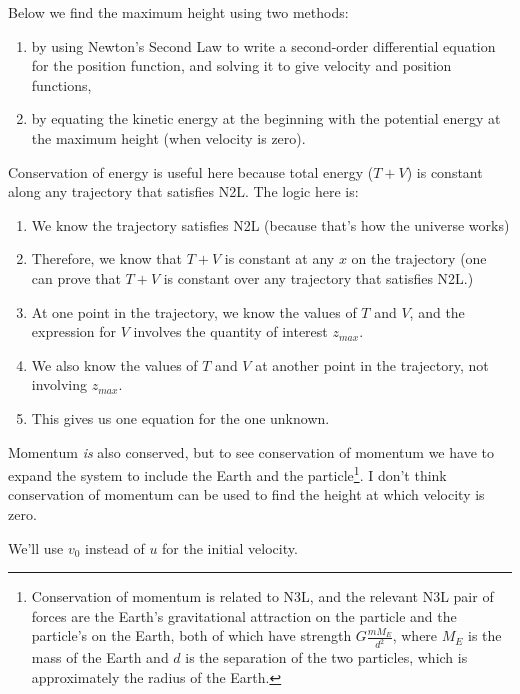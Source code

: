 Below we find the maximum height using two methods:
\begin{enumerate}
\item by using Newton's Second Law to write a second-order differential equation for the position
  function, and solving it to give velocity and position functions,
\item by equating the kinetic energy at the beginning with the potential energy at the maximum
  height (when velocity is zero).
\end{enumerate}

Conservation of energy is useful here because total energy ($T + V$) is constant along any
trajectory that satisfies N2L. The logic here is:
\begin{enumerate}
\item We know the trajectory satisfies N2L (because that's how the universe works)
\item Therefore, we know that $T + V$ is constant at any $x$ on the trajectory (one can prove that
  $T+V$ is constant over any trajectory that satisfies N2L.)
\item At one point in the trajectory, we know the values of $T$ and $V$, and the expression for $V$
  involves the quantity of interest $z_{max}$.
\item We also know the values of $T$ and $V$ at another point in the trajectory, not involving
  $z_{max}$.
\item This gives us one equation for the one unknown.
\end{enumerate}

Momentum \textit{is} also conserved, but to see conservation of momentum we have to expand the
system to include the Earth and the particle\footnote{Conservation of momentum is related to N3L,
  and the relevant N3L pair of forces are the Earth's gravitational attraction on the particle and
  the particle's on the Earth, both of which have strength $G\frac{mM_E}{d^2}$, where $M_E$ is the
  mass of the Earth and $d$ is the separation of the two particles, which is approximately the
  radius of the Earth.}. I don't think conservation of momentum can be used to find the height at
which velocity is zero.


We'll use $v_0$ instead of $u$ for the initial velocity.

